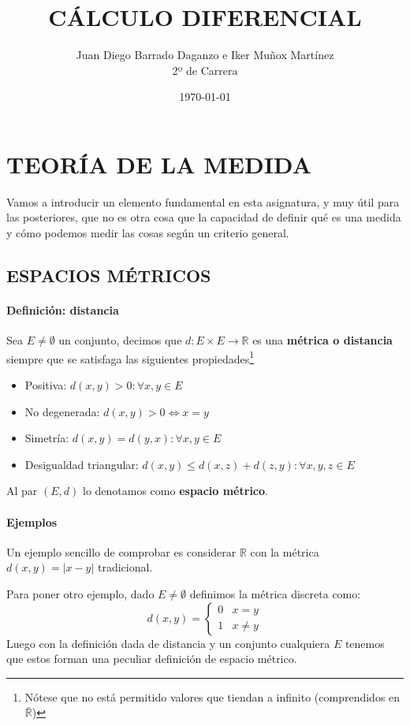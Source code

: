 \documentclass[10pt,a4paper,openright]{book}
\title{CÁLCULO DIFERENCIAL}
\author{Juan Diego Barrado Daganzo e Iker Muñox Martínez\\2º de Carrera} %
\date{\today}
\theoremstyle{break}
\begin{document}
\maketitle

\chapter*{TEORÍA DE LA MEDIDA}
Vamos a introducir un elemento fundamental en esta asignatura, y muy útil para las posteriores, que no es otra cosa que la capacidad de definir qué es una medida y cómo podemos medir las cosas según un criterio general.

\section*{ESPACIOS MÉTRICOS}

\subsubsection*{Definición: distancia}
Sea $E\neq \emptyset$ un conjunto, decimos que $d: E\times E \rightarrow \mathbb R$ es una \textbf{métrica o distancia} siempre que se satisfaga las siguientes propiedades\footnote{Nótese que no está permitido valores que tiendan a infinito (comprendidos en $\bar{\mathbb R}$)}
\begin{itemize}
\item Positiva: $d(x,y)>0: \forall x, y \in E$
\item No degenerada: $d(x,y) > 0 \Leftrightarrow x = y$
\item Simetría: $d(x,y) = d(y,x): \forall x,y \in E$
\item Desigualdad triangular: $d(x,y)\leq d(x,z)+ d(z,y): \forall x,y,z\in E$
\end{itemize}

Al par $(E,d)$ lo denotamos como \textbf{espacio métrico}.

\subsubsection*{Ejemplos}

Un ejemplo sencillo de comprobar es considerar $\mathbb R$ con la métrica $d(x,y) = |x-y|$ tradicional.

Para poner otro ejemplo, dado $E\neq \emptyset$ definimos la métrica discreta como:
$$d(x,y) = \begin{cases} 0 & x= y \\ 1 & x\neq y \end{cases}$$
Luego con la definición dada de distancia y un conjunto cualquiera $E$ tenemos que estos forman una peculiar definición de espacio métrico.
\end{document}
